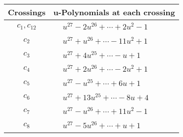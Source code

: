 \documentclass[1p]{elsarticle_modified}
\theoremstyle{definition}
\begin{document}
\begin{tabular}{m{50pt}|m{274pt}}
Crossings & \hspace{64pt}u-Polynomials at each crossing \\
\hline $$\begin{aligned}c_{1},c_{12}\end{aligned}$$&$\begin{aligned}
&u^{27}-2 u^{26}+\cdots+2 u^2-1
\end{aligned}$\\
\hline $$\begin{aligned}c_{2}\end{aligned}$$&$\begin{aligned}
&u^{27}+u^{26}+\cdots-11 u^2+1
\end{aligned}$\\
\hline $$\begin{aligned}c_{3}\end{aligned}$$&$\begin{aligned}
&u^{27}+4 u^{25}+\cdots- u+1
\end{aligned}$\\
\hline $$\begin{aligned}c_{4}\end{aligned}$$&$\begin{aligned}
&u^{27}+2 u^{26}+\cdots-2 u^2+1
\end{aligned}$\\
\hline $$\begin{aligned}c_{5}\end{aligned}$$&$\begin{aligned}
&u^{27}- u^{25}+\cdots+6 u+1
\end{aligned}$\\
\hline $$\begin{aligned}c_{6}\end{aligned}$$&$\begin{aligned}
&u^{27}+13 u^{25}+\cdots-8 u+4
\end{aligned}$\\
\hline $$\begin{aligned}c_{7}\end{aligned}$$&$\begin{aligned}
&u^{27}- u^{26}+\cdots+11 u^2-1
\end{aligned}$\\
\hline $$\begin{aligned}c_{8}\end{aligned}$$&$\begin{aligned}
&u^{27}-5 u^{26}+\cdots+u+1
\end{aligned}$\\

\end{tabular}
\end{document}
